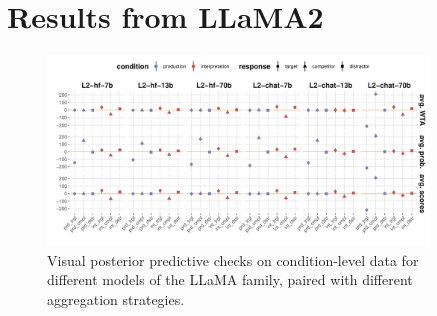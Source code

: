 \documentclass[fleqn]{article}
\begin{document}
\newpage
\appendix

\section{Results from LLaMA2}
\label{sec:LLaMA-results}

\begin{figure}[t]
  \centering
  \includegraphics[width=0.9\textwidth]{00-pics/vPPC_all_LLaMA_models.pdf}
  \caption{Visual posterior predictive checks on condition-level data for different models of the LLaMA family, paired with different aggregation strategies.}
  \label{fig:LLaMA-results-vPPC}
\end{figure}
\end{document}
